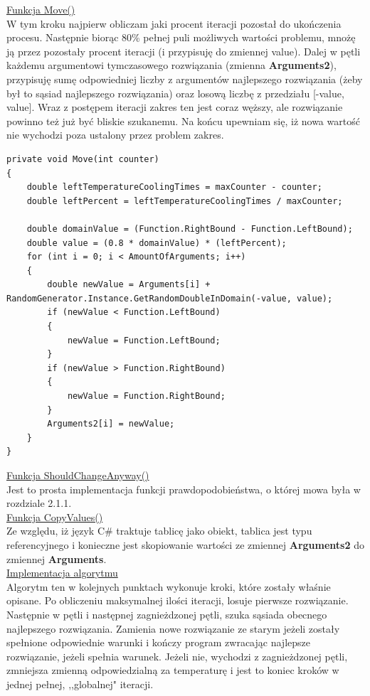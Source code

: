 \documentclass[twoside]{projektInzynierskiMS1}
\newcommand{\si}{ś}
\begin{document}
\underline{Funkcja Move()} \\
W tym kroku najpierw obliczam jaki procent iteracji pozostał do ukończenia procesu. Następnie biorąc 80\% pełnej puli możliwych warto\si ci problemu, mnożę ją przez pozostały procent iteracji (i przypisuję do zmiennej value). Dalej w pętli każdemu argumentowi tymczasowego rozwiązania (zmienna \textbf{Arguments2}), przypisuję sumę odpowiedniej liczby z argumentów najlepszego rozwiązania (żeby był to sąsiad najlepszego rozwiązania) oraz losową liczbę z przedziału [-value, value]. Wraz z postępem iteracji zakres ten jest coraz węższy, ale rozwiązanie powinno też już być bliskie szukanemu. Na końcu upewniam się, iż nowa warto\si ć nie wychodzi poza ustalony przez problem zakres. \\
\begin{verbatim}
private void Move(int counter)
{
    double leftTemperatureCoolingTimes = maxCounter - counter;
    double leftPercent = leftTemperatureCoolingTimes / maxCounter;

    double domainValue = (Function.RightBound - Function.LeftBound);
    double value = (0.8 * domainValue) * (leftPercent);
    for (int i = 0; i < AmountOfArguments; i++)
    {
        double newValue = Arguments[i] + 
RandomGenerator.Instance.GetRandomDoubleInDomain(-value, value);
        if (newValue < Function.LeftBound)
        {
            newValue = Function.LeftBound;
        }
        if (newValue > Function.RightBound)
        {
            newValue = Function.RightBound;
        }
        Arguments2[i] = newValue;
    }
}
\end{verbatim}

\underline{Funkcja ShouldChangeAnyway()} \\
Jest to prosta implementacja funkcji prawdopodobieństwa, o której mowa była w rozdziale 2.1.1. \\

\underline{Funkcja CopyValues()} \\
Ze względu, iż język C\# traktuje tablicę jako obiekt, tablica jest typu referencyjnego i konieczne jest skopiowanie warto\si ci ze zmiennej \textbf{Arguments2} do zmiennej \textbf{Arguments}. \\

\underline{Implementacja algorytmu} \\
Algorytm ten w kolejnych punktach wykonuje kroki, które zostały wła\si nie opisane. Po obliczeniu maksymalnej ilo\si ci iteracji, losuje pierwsze rozwiązanie. Następnie w pętli i następnej zagnieżdzonej pętli, szuka sąsiada obecnego najlepszego rozwiązania. Zamienia nowe rozwiązanie ze starym jeżeli zostały spełnione odpowiednie warunki i kończy program zwracając najlepsze rozwiązanie, jeżeli spełnia warunek. Jeżeli nie, wychodzi z zagnieżdzonej pętli, zmniejsza zmienną odpowiedzialną za temperaturę i jest to koniec kroków w jednej pełnej, ,,globalnej" iteracji.
\end{document}
